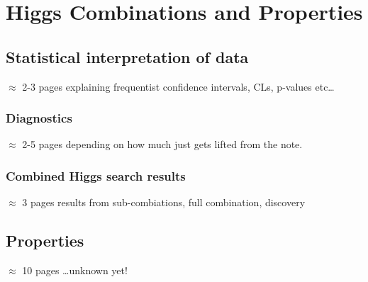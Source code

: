 \chapter{Higgs Combinations and Properties}
\label{combinations}

\section{Statistical interpretation of data}
$\approx$ 2-3 pages explaining frequentist confidence intervals, CLs, p-values etc\ldots

\subsection{Diagnostics}
$\approx$ 2-5 pages depending on how much just gets lifted from the note. 

\subsection{Combined Higgs search results}
$\approx$ 3 pages results from sub-combiations, full combination, discovery

\section{Properties}
$\approx$ 10 pages \ldots unknown yet!


